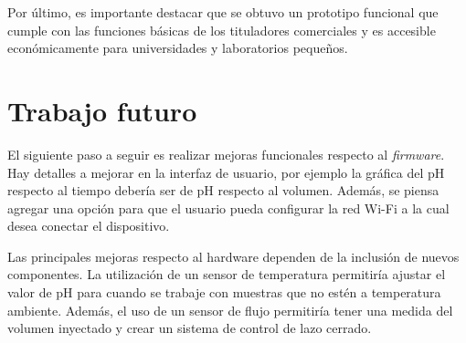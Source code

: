 Por último, es importante destacar que se obtuvo un prototipo funcional que cumple con las funciones básicas de los tituladores comerciales y es accesible económicamente para universidades y laboratorios pequeños.

\section{Trabajo futuro}

El siguiente paso a seguir es realizar mejoras funcionales respecto al \textit{firmware}. Hay detalles a mejorar en la interfaz de usuario, por ejemplo la gráfica del pH respecto al tiempo debería ser de pH respecto al volumen. Además, se piensa agregar una opción para que el usuario pueda configurar la red Wi-Fi a la cual desea conectar el dispositivo. 

Las principales mejoras respecto al hardware dependen de la inclusión de nuevos componentes. La utilización de un sensor de temperatura permitiría ajustar el valor de pH para cuando se trabaje con muestras que no estén a temperatura ambiente. Además, el uso de un sensor de flujo permitiría tener una medida del volumen inyectado y crear un sistema de control de lazo cerrado.